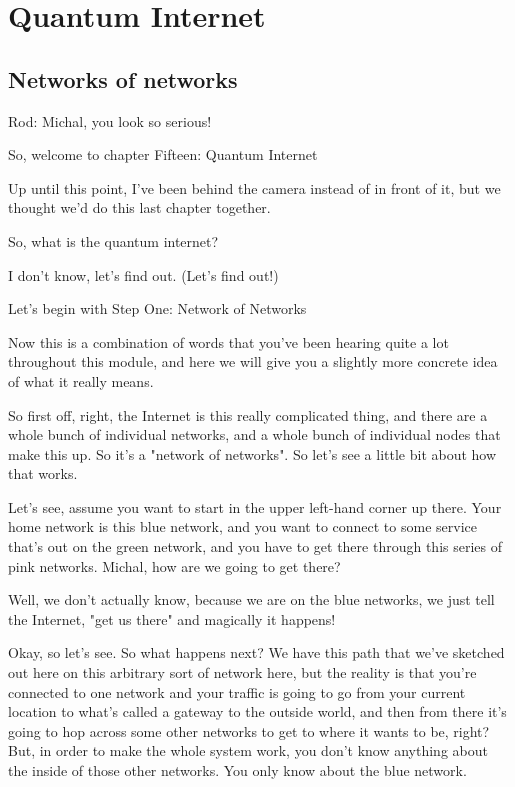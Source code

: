 \chapter{Quantum Internet}

\section{Networks of networks}

Rod: Michal, you look so serious!

So, welcome to chapter Fifteen: Quantum Internet

Up until this point, I've been behind the camera instead of in front of it, but we thought we'd do this last chapter together.

So, what is the quantum internet?

I don't know, let's find out. (Let's find out!)

Let's begin with Step One: Network of Networks

Now this is a combination of words that you've been hearing quite a lot throughout this module, and here we will give you a slightly more concrete idea of what it really means.

So first off, right, the Internet is this really complicated thing, and there are a whole bunch of individual networks, and a whole bunch of individual nodes that make this up. So it's a "network of networks". So let's see a little bit about how that works.

Let's see, assume you want to start in the upper left-hand corner up there. Your home network is this blue network, and you want to connect to some service that's out on the green network, and you have to get there through this series of pink networks. Michal, how are we going to get there?

Well, we don't actually know, because we are on the blue networks, we just tell the Internet, "get us there" and magically it happens!

Okay, so let's see. So what happens next? We have this path that we've sketched out here on this arbitrary sort of network here, but the reality is that you're connected to one network and your traffic is going to go from your current location to what's called a gateway to the outside world, and then from there it's going to hop across some other networks to get to where it wants to be, right? But, in order to make the whole system work, you don't know anything about the inside of those other networks. You only know about the blue network.

